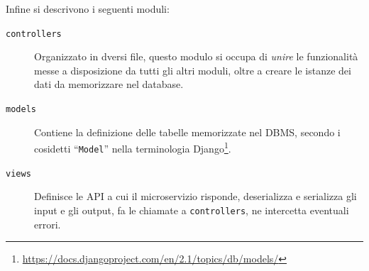 Infine si descrivono i seguenti moduli:
\begin{description}
	\item[\texttt{controllers}]Organizzato in dversi file, questo modulo si occupa di
	\textit{unire} le funzionalità messe a disposizione da tutti gli altri moduli,
	oltre a creare le istanze dei dati da memorizzare nel database.
	\item[\texttt{models}]Contiene la definizione delle tabelle memorizzate nel DBMS, secondo
	i cosidetti ``\texttt{Model}'' nella terminologia
	Django\footnote{\url{https://docs.djangoproject.com/en/2.1/topics/db/models/}}.
	\item[\texttt{views}]Definisce le API a cui il microservizio risponde, deserializza e serializza
	gli input e gli output, fa le chiamate a \texttt{controllers}, ne intercetta eventuali errori.
\end{description}